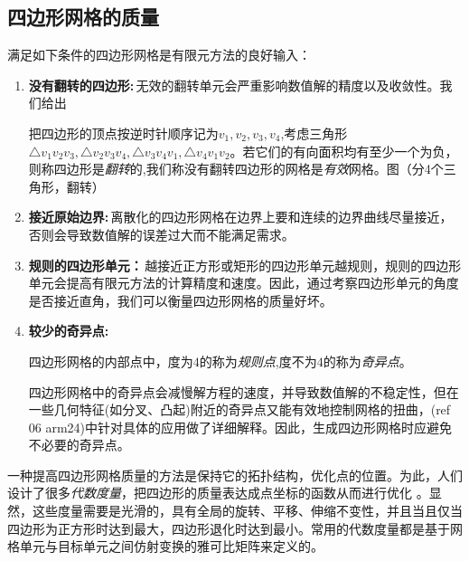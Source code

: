 \subsection{四边形网格的质量}\label{quad-metric}
满足如下条件的四边形网格是有限元方法的良好输入：
\begin{enumerate}
	\item \textbf{没有翻转的四边形:}\,无效的翻转单元会严重影响数值解的精度以及收敛性。我们给出
	\begin{definition}\label{def:invertquad}
		把四边形的顶点按逆时针顺序记为$v_1,v_2,v_3,v_4$,考虑三角形$\triangle v_1v_2v_3,\triangle v_2v_3v_4,\triangle v_3v_4v_1,\triangle v_4v_1v_2$。若它们的有向面积均有至少一个为负，则称四边形是\emph{翻转}的,我们称没有翻转四边形的网格是\emph{有效}网格。图（分4个三角形，翻转）
	\end{definition}
	\item \textbf{接近原始边界:}\,离散化的四边形网格在边界上要和连续的边界曲线尽量接近，否则会导致数值解的误差过大而不能满足需求。
	
	\item \textbf{规则的四边形单元：}\,越接近正方形或矩形的四边形单元越规则，规则的四边形单元会提高有限元方法的计算精度和速度。因此，通过考察四边形单元的角度是否接近直角，我们可以衡量四边形网格的质量好坏。
	\item \textbf{较少的奇异点:}\,
		\begin{definition}\label{singularity}
			四边形网格的内部点中，度为$4$的称为\emph{规则点},度不为$4$的称为\emph{奇异点}。
		\end{definition}
		四边形网格中的奇异点会减慢解方程的速度，并导致数值解的不稳定性，但在一些几何特征(如分叉、凸起)附近的奇异点又能有效地控制网格的扭曲，(ref 06 arm24)中针对具体的应用做了详细解释。因此，生成四边形网格时应避免不必要的奇异点。

\end{enumerate}

一种提高四边形网格质量的方法是保持它的拓扑结构，优化点的位置。为此，人们设计了很多\emph{代数度量}，把四边形的质量表达成点坐标的函数从而进行优化 。显然，这些度量需要是光滑的，具有全局的旋转、平移、伸缩不变性，并且当且仅当四边形为正方形时达到最大，四边形退化时达到最小。常用的代数度量都是基于网格单元与目标单元之间仿射变换的雅可比矩阵来定义的。

